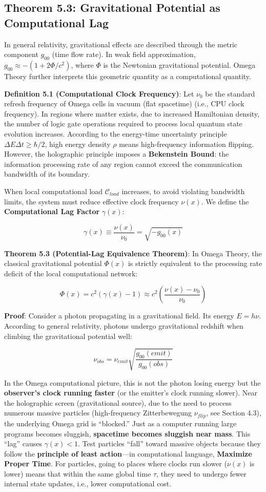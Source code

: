 \subsection{Theorem 5.3: Gravitational Potential as Computational Lag}

In general relativity, gravitational effects are described through the metric component $g_{00}$ (time flow rate). In weak field approximation, $g_{00} \approx -(1 + 2\Phi/c^2)$, where $\Phi$ is the Newtonian gravitational potential.
Omega Theory further interprets this geometric quantity as a computational quantity.

\textbf{Definition 5.1 (Computational Clock Frequency)}:
Let $\nu_0$ be the standard refresh frequency of Omega cells in vacuum (flat spacetime) (i.e., CPU clock frequency). In regions where matter exists, due to increased Hamiltonian density, the number of logic gate operations required to process local quantum state evolution increases.
According to the energy-time uncertainty principle $\Delta E \Delta t \ge \hbar/2$, high energy density $\rho$ means high-frequency information flipping. However, the holographic principle imposes a \textbf{Bekenstein Bound}: the information processing rate of any region cannot exceed the communication bandwidth of its boundary.

When local computational load $\mathcal{C}_{load}$ increases, to avoid violating bandwidth limits, the system must reduce effective clock frequency $\nu(x)$. We define the \textbf{Computational Lag Factor} $\gamma(x)$:

\[\gamma(x) \equiv \frac{\nu(x)}{\nu_0} = \sqrt{-g_{00}(x)}\]

\textbf{Theorem 5.3 (Potential-Lag Equivalence Theorem)}:
In Omega Theory, the classical gravitational potential $\Phi(x)$ is strictly equivalent to the processing rate deficit of the local computational network:

\[\Phi(x) = c^2 \left( \gamma(x) - 1 \right) \approx c^2 \left( \frac{\nu(x) - \nu_0}{\nu_0} \right)\]

\textbf{Proof}:
Consider a photon propagating in a gravitational field. Its energy $E = h\nu$.
According to general relativity, photons undergo gravitational redshift when climbing the gravitational potential well:

\[\nu_{obs} = \nu_{emit} \sqrt{\frac{g_{00}(emit)}{g_{00}(obs)}}\]

In the Omega computational picture, this is not the photon losing energy but the \textbf{observer's clock running faster} (or the emitter's clock running slower).
Near the holographic screen (gravitational source), due to the need to process numerous massive particles (high-frequency Zitterbewegung $\nu_{flip}$, see Section 4.3), the underlying Omega grid is ``blocked.'' Just as a computer running large programs becomes sluggish, \textbf{spacetime becomes sluggish near mass}.
This ``lag'' causes $\gamma(x) < 1$.
Test particles ``fall'' toward massive objects because they follow the \textbf{principle of least action}---in computational language, \textbf{Maximize Proper Time}.
For particles, going to places where clocks run slower ($\nu(x)$ is lower) means that within the same global time $\tau$, they need to undergo fewer internal state updates, i.e., lower computational cost.

